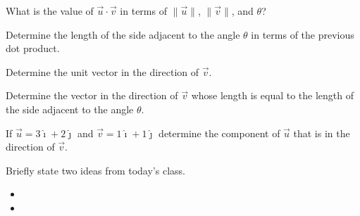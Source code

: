 \begin{problem}
\begin{subproblem}
      \clearpage

    \item What is the value of $\vec{u}\cdot\vec{v}$ in terms of $\|\vec{u}\|$, $\|\vec{v}\|$, and $\theta$?
      \vfill

    \item Determine the length of the side adjacent to the angle $\theta$ in terms of the previous dot product.
      \vfill

    \item Determine the unit vector in the direction of $\vec{v}$.
      \vfill

    \item Determine the vector in the direction of $\vec{v}$ whose length is equal to the length of the side adjacent to the angle $\theta$.
      \vfill

  \end{subproblem}

  \clearpage

  \item If $\vec{u}=3\hat{\imath}+2\hat{\jmath}$ and $\vec{v}=1\hat{\imath}+1\hat{\jmath}$ determine the component of $\vec{u}$ that is in the direction of $\vec{v}$.
    \vfill

\end{problem}

\postClass

\begin{problem}
\item Briefly state two ideas from today's class.
  \begin{itemize}
  \item
  \item
  \end{itemize}
\item
  \begin{subproblem}
    \item
  \end{subproblem}
\end{problem}



